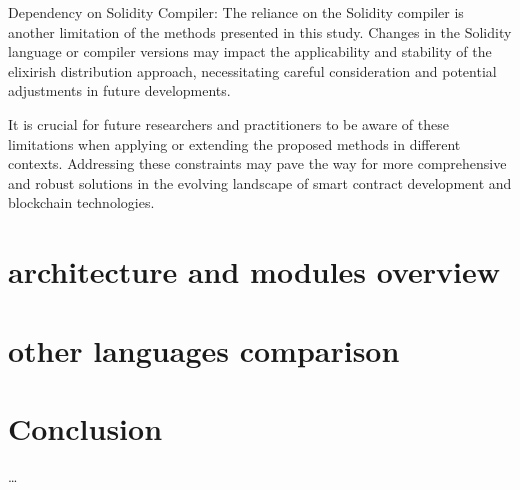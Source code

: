 Dependency on Solidity Compiler:
The reliance on the Solidity compiler is another limitation of the methods presented in this study. Changes in the Solidity language or compiler versions may impact the applicability and stability of the elixirish distribution approach, necessitating careful consideration and potential adjustments in future developments.

It is crucial for future researchers and practitioners to be aware of these limitations when applying or extending the proposed methods in different contexts. Addressing these constraints may pave the way for more comprehensive and robust solutions in the evolving landscape of smart contract development and blockchain technologies.

\section{architecture and modules overview}
\label{}

\section{other languages comparison}
\label{}

\section{Conclusion}



\ldots


